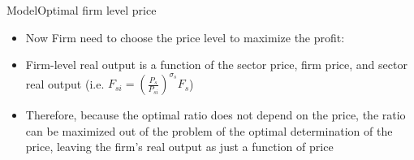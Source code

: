 \documentclass[aspectratio=169]{beamer}
\begin{document}
%     
% 		
	

\begin{frame}{Model}{Optimal firm level price}
	\begin{itemize}
		
		\item Now Firm need to choose the price level to maximize the profit:
		
		\item Firm-level real output is a function of the sector price, firm price, and sector real output (i.e. $F_{si} = (\frac{P_s}{ P_{si}})^{\sigma_s}{F}_s $)
		\item Therefore, because the optimal  ratio does not depend on the price, the ratio can be maximized out of the problem of the optimal determination of the price, leaving the firm’s real output as just a function of price
		
	\end{itemize}
\end{frame}
\end{document}
